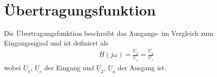 

\newpage

\section{Übertragungsfunktion}
Die Übertragungsfunktion beschreibt das Ausgangs- im Vergleich zum
Eingangssignal und ist definiert als
\begin{align}
    \underline{H}(j\omega)=\frac{\underline{U}_2}{\underline{U}_1}=\frac{\underline{U}_a}{\underline{U}_e}
\end{align}
wobei $\underline{U}_1$, $\underline{U}_e$ der Eingang und $\underline{U}_2$, $\underline{U}_a$ der Ausgang ist.

